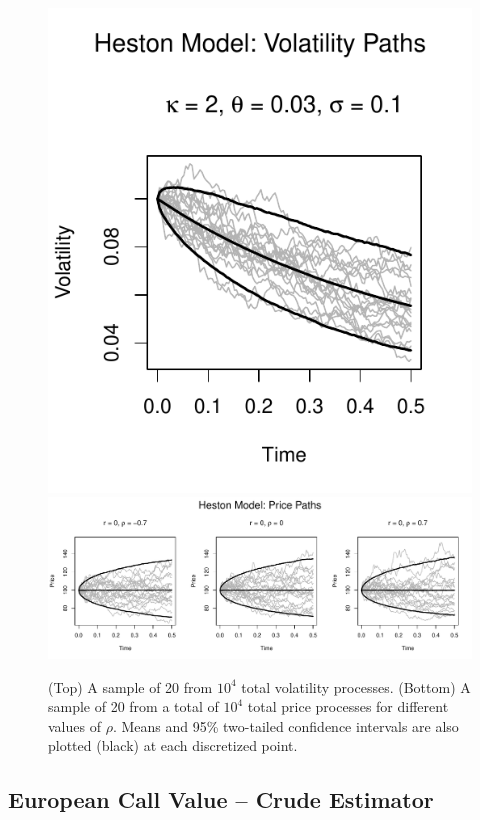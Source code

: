 \documentclass[12pt]{article}
\begin{document}
\begin{figure}[H]
	\centering
	\includegraphics[scale=0.85]{../plots/q4/heston_sample_vols.pdf}
	\includegraphics[scale=0.85]{../plots/q4/heston_sample_prices.pdf}
\caption{(Top) A sample of 20 from $10^4$ total volatility processes. (Bottom) A sample of 20 from a total of $10^4$ total price processes for different values of $\rho$. Means and 95\% two-tailed confidence intervals are also plotted (black) at each discretized point.}
\label{fig:heston_sample}
\end{figure}

\subsection{{\normalfont European Call Value -- Crude Estimator}}
\end{document}
